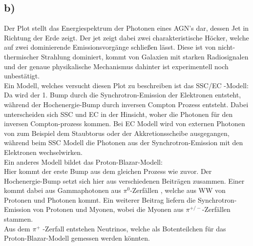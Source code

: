 \subsection{b)}
Der Plot stellt das Energiespektrum der Photonen eines AGN's dar, dessen Jet in Richtung der Erde zeigt.
Der jet zeigt dabei zwei charakteristische Höcker, welche auf zwei dominierende Emissionsvorgänge
schließen lässt. Diese ist von nicht-thermischer Strahlung dominiert, kommt von Galaxien mit starken
Radiosignalen und der genaue physikalische Mechanismus dahinter ist experimentell noch unbestätigt.\\
Ein Modell, welches versucht diesen Plot zu beschreiben ist das SSC/EC -Modell: \\
Da wird der 1. Bump durch die Synchrotron-Emission der Elektronen entsteht,
während der Hochenergie-Bump durch inversen Compton Prozess entsteht.
Dabei unterscheiden sich SSC und EC in der Hinsicht, woher die Photonen für
den inversen Compton-prozess kommen. Bei EC Modell wird von externen Photonen von zum 
Beispiel dem Staubtorus oder der Akkretionsscheibe ausgegangen, während beim SSC
Modell die Photonen aus der Synchrotron-Emission mit den Elektronen wechselwirken.\\

Ein anderes Modell bildet das Proton-Blazar-Modell:\\
Hier kommt der erste Bump aus dem gleichen Prozess wie zuvor. Der Hochenergie-Bump 
setzt sich hier aus verschiedenen Beiträgen zusammen. Einer kommt
dabei aus Gammaphotonen aus $\pi ^0$-Zerfällen , welche aus WW von 
Protonen und Photonen kommt.
Ein weiterer Beitrag liefern die Synchrotron-Emission von Protonen und Myonen, wobei
die Myonen aus $\pi ^{+/-}$-Zerfällen stammen.\\

Aus dem $\pi ^+$ -Zerfall entstehen Neutrinos, welche als Botenteilchen für das
Proton-Blazar-Modell gemessen werden könnten.

